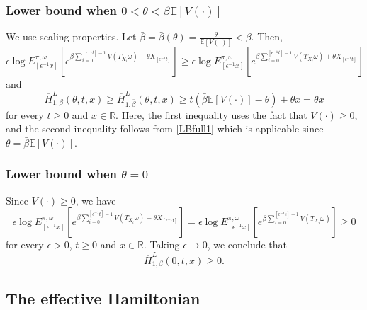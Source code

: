\documentclass[a4paper]{amsart}
\numberwithin{equation}{section}
\theoremstyle{plain}
\theoremstyle{remark}
\begin{document}
\subsubsection{Lower bound when $0<\theta<\beta\mathbb{E}[V(\cdot)]$}
{}{We use scaling properties.}
Let $\bar\beta = \bar\beta(\theta) = \frac{\theta}{\mathbb{E}[V(\cdot)]} < \beta$. Then,
\begin{equation}\label{anlamyap}
{\epsilon}\log E_{[{\epsilon^{-1}} x]}^{\pi,\omega}\left[e^{\beta\sum_{i=0}^{[{\epsilon^{-1}} t]-1} V(T_{X_i}\omega) + \theta X_{[{\epsilon^{-1}} t]}}\right] \ge {\epsilon}\log E_{[{\epsilon^{-1}} x]}^{\pi,\omega}\left[e^{\bar\beta\sum_{i=0}^{[{\epsilon^{-1}} t]-1} V(T_{X_i}\omega) + \theta X_{[{\epsilon^{-1}} t]}}\right]
\end{equation}
and
\begin{equation}\label{LBfull2}
\overline H_{1,\beta}^L(\theta,t,x) \ge \overline H_{1,\bar\beta}^L(\theta,t,x) \ge t(\bar\beta\mathbb{E}[V(\cdot)] - \theta) + \theta x = \theta x
\end{equation}
for every $t\ge0$ and $x\in\mathbb{R}$. Here, the first inequality uses the fact that $V(\cdot)\ge0$, and the second inequality follows from \eqref{LBfull1} which is applicable since $\theta = \bar\beta\mathbb{E}[V(\cdot)]$.

\subsubsection{Lower bound when $\theta = 0$}

Since $V(\cdot)\ge0$, we have
\begin{equation}\label{anlamboz}
{\epsilon}\log E_{[{\epsilon^{-1}} x]}^{\pi,\omega}\left[e^{\beta\sum_{i=0}^{[{\epsilon^{-1}} t]-1} V(T_{X_i}\omega) + \theta X_{[{\epsilon^{-1}} t]}}\right] = {\epsilon}\log E_{[{\epsilon^{-1}} x]}^{\pi,\omega}\left[e^{\beta\sum_{i=0}^{[{\epsilon^{-1}} t]-1} V(T_{X_i}\omega)}\right] \ge 0
\end{equation}
for every ${\epsilon}>0$, $t\ge0$ and $x\in\mathbb{R}$. Taking ${\epsilon}\to0$, we conclude that
\begin{equation}\label{LBfull3}
\overline H_{1,\beta}^L(0,t,x)\ge 0.
\end{equation}

\subsection{The effective Hamiltonian}
\end{document}
